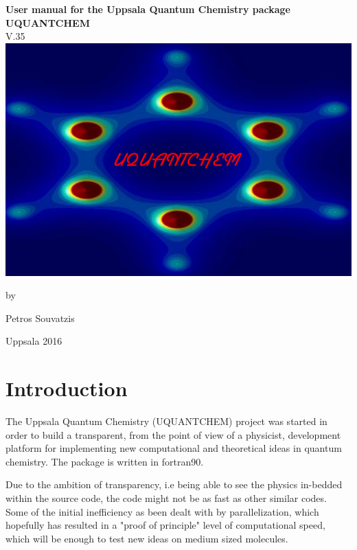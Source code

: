 \documentclass[a4paper,twoside,openany]{book}
\begin{document}
\begin{titlepage}
\begin{centering}
\huge
{\bf User manual for the Uppsala Quantum Chemistry package}\\
{\bf UQUANTCHEM }\\
V.35 \\
\vspace{ 1cm}
\includegraphics[scale=0.5]{figs/uquantchemLOGO3.jpeg}

\LARGE
\vspace{1cm}
by

Petros Souvatzis



Uppsala  2016

\end{centering}
\end{titlepage}


\tableofcontents

\chapter{Introduction}
The Uppsala Quantum Chemistry (UQUANTCHEM) project was started in order to build a transparent, from the point of view of a physicist, development platform for 
implementing new computational and  theoretical  ideas  in quantum chemistry. The package is written in fortran90.

 Due to the ambition of transparency, i.e being able to see the physics in-bedded within  
 the source code, the code might not be as fast as other similar codes. Some of the initial inefficiency as been dealt with by parallelization, which hopefully 
has resulted in a  "proof of principle" level of computational speed, which  will be enough to test new ideas on medium sized molecules.
\end{document}
